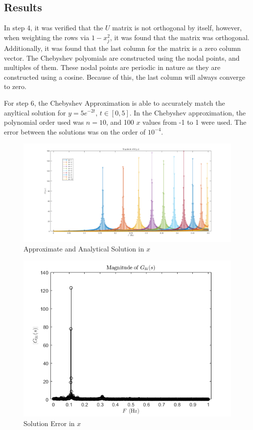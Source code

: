 \documentclass{article}
\begin{document}
\subsection{Results}

In step 4, it was verified that the $U$ matrix is not orthogonal by itself, however, when weighting the rows via  $1-x_j^2$, it was found that the matrix was orthogonal. Additionally, it was found that the last column for the matrix is a zero column vector. The Chebyshev polyomials are constructed using the nodal points, and multiples of them. These nodal points are periodic in nature as they are constructed using a cosine. Because of this, the last column will always converge to zero. 
\par
For step 6, the Chebyshev Approximation is able to accurately match the anyltical solution for $y=5e^{-2t}$, $t \in [0, 5]$. In the Chebyshev approximation, the polynomial order used was $n=10$, and 100 $x$ values from -1 to 1 were used. The error between the solutions was on the order of $10^{-4}$.

\begin{figure}[h]
    \centering
    \includegraphics[width=.8\linewidth]{untitled.png}
    \caption{Approximate and Analytical Solution in $x$}
    \label{fig:enter-label}
\end{figure}

\begin{figure}[h]
    \centering
    \includegraphics[width=.8\linewidth]{untitled2.png}
    \caption{Solution Error in $x$}
    \label{fig:enter-label}
\end{figure}
\end{document}
